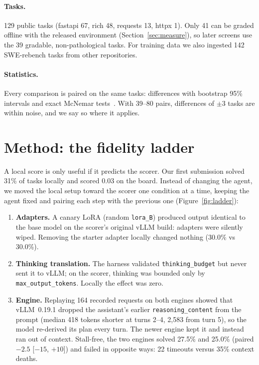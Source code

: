 \documentclass[11pt]{article}
\begin{document}
\paragraph{Tasks.} 129 public tasks (fastapi 67, rich 48, requests 13, httpx 1). Only 41 can be graded offline with the released environment (Section~\ref{sec:measure}), so later screens use the 39 gradable, non-pathological tasks. For training data we also ingested 142 SWE-rebench tasks from other repositories.

\paragraph{Statistics.} Every comparison is paired on the same tasks: differences with bootstrap 95\% intervals and exact McNemar tests~\citep{agarwal2021rliable}. With 39--80 pairs, differences of $\pm$3 tasks are within noise, and we say so where it applies.

\section{Method: the fidelity ladder}
A local score is only useful if it predicts the scorer. Our first submission solved 31\% of tasks locally and scored 0.03 on the board. Instead of changing the agent, we moved the local setup toward the scorer one condition at a time, keeping the agent fixed and pairing each step with the previous one (Figure~\ref{fig:ladder}):
\begin{enumerate}
\item \textbf{Adapters.} A canary LoRA (random \texttt{lora\_B}) produced output identical to the base model on the scorer's original vLLM build: adapters were silently wiped. Removing the starter adapter locally changed nothing (30.0\% vs 30.0\%).
\item \textbf{Thinking translation.} The harness validated \texttt{thinking\_budget} but never sent it to vLLM; on the scorer, thinking was bounded only by \texttt{max\_output\_tokens}. Locally the effect was zero.
\item \textbf{Engine.} Replaying 164 recorded requests on both engines showed that vLLM~0.19.1 dropped the assistant's earlier \texttt{reasoning\_content} from the prompt (median 418 tokens shorter at turns 2--4, 2,583 from turn 5), so the model re-derived its plan every turn. The newer engine kept it and instead ran out of context. Stall-free, the two engines solved 27.5\% and 25.0\% (paired $-2.5$ [$-15$, $+10$]) and failed in opposite ways: 22 timeouts versus 35\% context deaths.
\end{enumerate}
\end{document}
